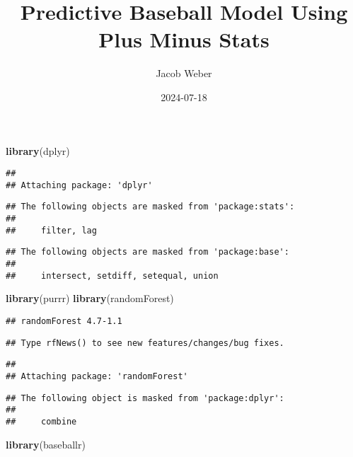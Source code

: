 \documentclass[
]{article}
\title{Predictive Baseball Model Using Plus Minus Stats}
\author{Jacob Weber}
\date{2024-07-18}
\newenvironment{Shaded}{\begin{snugshade}}{\end{snugshade}}
\newcommand{\FunctionTok}[1]{\textcolor[rgb]{0.13,0.29,0.53}{\textbf{#1}}}
\newcommand{\NormalTok}[1]{#1}
\begin{document}
\maketitle

\begin{Shaded}
\begin{Highlighting}[]
\FunctionTok{library}\NormalTok{(dplyr)}
\end{Highlighting}
\end{Shaded}

\begin{verbatim}
## 
## Attaching package: 'dplyr'
\end{verbatim}

\begin{verbatim}
## The following objects are masked from 'package:stats':
## 
##     filter, lag
\end{verbatim}

\begin{verbatim}
## The following objects are masked from 'package:base':
## 
##     intersect, setdiff, setequal, union
\end{verbatim}

\begin{Shaded}
\begin{Highlighting}[]
\FunctionTok{library}\NormalTok{(purrr)}
\FunctionTok{library}\NormalTok{(randomForest)}
\end{Highlighting}
\end{Shaded}

\begin{verbatim}
## randomForest 4.7-1.1
\end{verbatim}

\begin{verbatim}
## Type rfNews() to see new features/changes/bug fixes.
\end{verbatim}

\begin{verbatim}
## 
## Attaching package: 'randomForest'
\end{verbatim}

\begin{verbatim}
## The following object is masked from 'package:dplyr':
## 
##     combine
\end{verbatim}

\begin{Shaded}
\begin{Highlighting}[]
\FunctionTok{library}\NormalTok{(baseballr)}
\end{Highlighting}
\end{Shaded}
\end{document}

